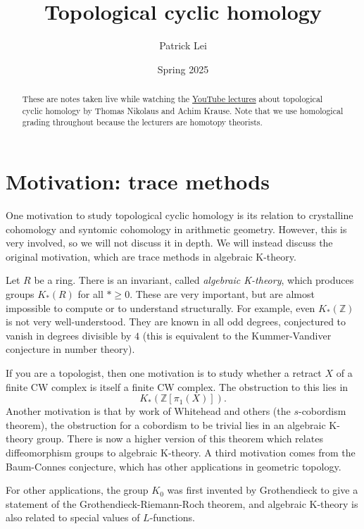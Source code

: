\documentclass[10pt, oneside]{memoir}
\title{Topological cyclic homology}
\author{Patrick Lei}
\date{Spring 2025}
\theoremstyle{definition}
\theoremstyle{remark}
\theoremstyle{plain}
\theoremstyle{definition}
\theoremstyle{remark}
\newcommand{\Z}{\mathbb{Z}}
\newcommand{\1}{\mathbf{1}}
\newcommand{\2}{\mathbf{2}}
\newcommand{\3}{\mathbf{3}}
\begin{document}
\maketitle\thispagestyle{empty}
\begin{abstract}
    These are notes taken live while watching the \href{https://www.youtube.com/playlist?list=PLsmqTkj4MGTB8pNGvW0iuKUFmBlOSke-C}{YouTube lectures} about topological cyclic homology by Thomas Nikolaus and Achim Krause. Note that we use homological grading throughout because the lecturers are homotopy theorists.
\end{abstract}
\clearpage
\tableofcontents
\clearpage

\section*{Motivation: trace methods}%
\label{sec:Motivation}

One motivation to study topological cyclic homology is its relation to crystalline cohomology and syntomic cohomology in arithmetic geometry. However, this is very involved, so we will not discuss it in depth. We will instead discuss the original motivation, which are trace methods in algebraic K-theory.

Let $R$ be a ring. There is an invariant, called \textit{algebraic K-theory}, which produces groups $K_*(R)$ for all $* \geq 0$. These are very important, but are almost impossible to compute or to understand structurally. For example, even $K_*(\Z)$ is not very well-understood. They are known in all odd degrees, conjectured to vanish in degrees divisible by $4$ (this is equivalent to the Kummer-Vandiver conjecture in number theory). 

If you are a topologist, then one motivation is to study whether a retract $X$ of a finite CW complex is itself a finite CW complex. The obstruction to this lies in 
\[
    K_*(\Z[\pi_1(X)]).
\]
Another motivation is that by work of Whitehead and others (the $s$-cobordism theorem), the obstruction for a cobordism to be trivial lies in an algebraic K-theory group. There is now a higher version of this theorem which relates diffeomorphism groups to algebraic K-theory. A third motivation comes from the Baum-Connes conjecture, which has other applications in geometric topology. 

For other applications, the group $K_0$ was first invented by Grothendieck to give a statement of the Grothendieck-Riemann-Roch theorem, and algebraic K-theory is also related to special values of $L$-functions. 
\end{document}
